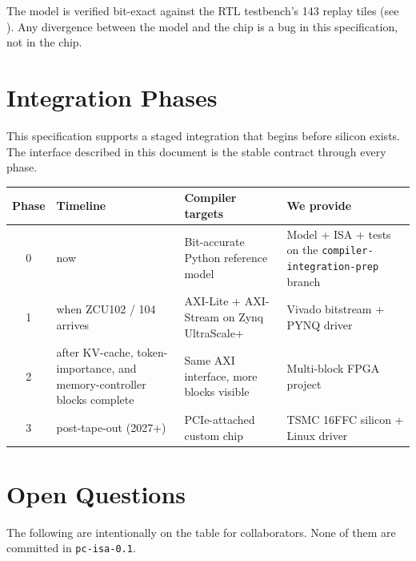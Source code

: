 \documentclass[11pt]{article}
\begin{document}
\noindent
The model is verified bit-exact against the RTL testbench's 143 replay tiles
(see ). Any
divergence between the model and the chip is a bug in this specification,
not in the chip.

\section{Integration Phases}
\label{sec:phases}

This specification supports a staged integration that begins before silicon
exists. The interface described in this document is the stable contract
through every phase.

\begin{table}[ht]
\centering
\small
\renewcommand{\arraystretch}{1.2}
\begin{tabular}{@{}c p{3.0cm} p{4.0cm} p{5.0cm}@{}}
\toprule
Phase & Timeline & Compiler targets & We provide \\
\midrule
0 & now & Bit-accurate Python reference model & Model + ISA + tests on the \texttt{compiler-integration-prep} branch \\
1 & when ZCU102 / 104 arrives & AXI-Lite + AXI-Stream on Zynq UltraScale+ & Vivado bitstream + PYNQ driver \\
2 & after KV-cache, token-importance, and memory-controller blocks complete & Same AXI interface, more blocks visible & Multi-block FPGA project \\
3 & post-tape-out (2027+) & PCIe-attached custom chip & TSMC 16FFC silicon + Linux driver \\
\bottomrule
\end{tabular}
\end{table}

\section{Open Questions}
\label{sec:open}

The following are intentionally on the table for collaborators. None of them
are committed in \texttt{pc-isa-0.1}.
\end{document}
